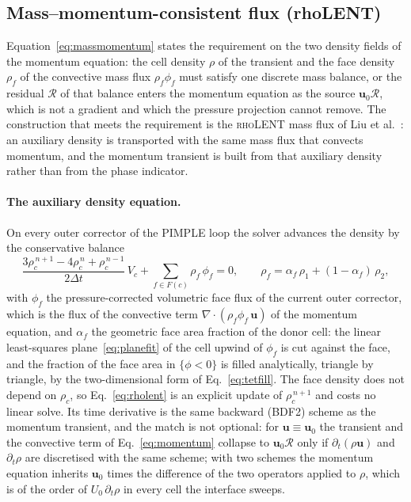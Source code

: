 \documentclass[preprint,3p,11pt]{elsarticle}
\newcommand{\uvec}{\mathbf{u}}
\begin{document}
\subsection{Mass--momentum-consistent flux (rhoLENT)}
\label{sec:rholent}
Equation~\eqref{eq:massmomentum} states the requirement on the two density fields of the
momentum equation: the cell density $\rho$ of the transient and the face density $\rho_f$
of the convective mass flux $\rho_f\phi_f$ must satisfy one discrete mass balance, or the
residual $\mathcal R$ of that balance enters the momentum equation as the source
$\uvec_0\mathcal R$, which is not a gradient and which the pressure projection cannot
remove. The construction that meets the requirement is the \textsc{rhoLENT} mass flux of
Liu et al.~\cite{liu2023}: an auxiliary density is transported with the same mass flux
that convects momentum, and the momentum transient is built from that auxiliary density
rather than from the phase indicator.

\paragraph{The auxiliary density equation.} On every outer corrector of the PIMPLE loop
the solver advances the density by the conservative balance
\begin{equation}
  \frac{3\rho_c^{\,n+1}-4\rho_c^{\,n}+\rho_c^{\,n-1}}{2\Delta t}\,V_c
  + \sum_{f\in F(c)} \rho_f\,\phi_f = 0,
  \qquad
  \rho_f = \alpha_f\,\rho_1 + (1-\alpha_f)\,\rho_2 ,
  \label{eq:rholent}
\end{equation}
with $\phi_f$ the pressure-corrected volumetric face flux of the current outer corrector,
which is the flux of the convective term $\nabla\cdot(\rho_f\phi_f\,\uvec)$ of the momentum
equation, and $\alpha_f$ the geometric face area fraction of the donor cell: the linear
least-squares plane~\eqref{eq:planefit} of the cell upwind of $\phi_f$ is cut against the
face, and the fraction of the face area in $\{\phi<0\}$ is filled analytically, triangle by
triangle, by the two-dimensional form of Eq.~\eqref{eq:tetfill}. The face density does not
depend on $\rho_c$, so Eq.~\eqref{eq:rholent} is an explicit update of $\rho_c^{\,n+1}$ and
costs no linear solve. Its time derivative is the same backward (BDF2) scheme as the
momentum transient, and the match is not optional: for $\uvec\equiv\uvec_0$ the transient
and the convective term of Eq.~\eqref{eq:momentum} collapse to $\uvec_0\mathcal R$ only if
$\partial_t(\rho\uvec)$ and $\partial_t\rho$ are discretised with the same scheme; with two
schemes the momentum equation inherits $\uvec_0$ times the difference of the two operators
applied to $\rho$, which is of the order of $U_0\,\partial_t\rho$ in every cell the
interface sweeps.
\end{document}
